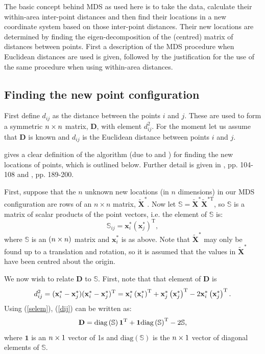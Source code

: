 The basic concept behind MDS as used here is to take the data, calculate their within-area inter-point distances and then find their locations in a new coordinate system based on those inter-point distances. Their new locations are determined by finding the eigen-decomposition of the (centred) matrix of distances between points. First a description of the MDS procedure when Euclidean distances are used is given, followed by the justification for the use of the same procedure when using within-area distances. 

\subsection{Finding the new point configuration}

First define $d_{ij}$ as the distance between the points $i$ and $j$. These are used to form a symmetric $n \times n$ matrix, $\mathbf{D}$, with \ijth element $d^2_{ij}$. For the moment let us assume that $\mathbf{D}$ is known and $d_{ij}$ is the Euclidean distance between points $i$ and $j$. 

 gives a clear definition of the algorithm (due to \cite{schoenberg35} and \cite{torgerson}) for finding the new locations of points, which is outlined below. Further detail is given in , pp. 104-108 and , pp. 189-200.

First, suppose that the $n$ unknown new locations (in $n$ dimensions) in our MDS configuration are rows of an $n \times n$ matrix, $\tilde{\mathbf{X}}^*$. Now let $\mathbb{S}=\tilde{\mathbf{X}}^{*} \tilde{\mathbf{X}}^{*\text{T}} $, so $\mathbb{S}$ is a matrix of scalar products of the point vectors, i.e. the \ijth element of $\mathbb{S}$ is:
\begin{equation}
\mathbb{S}_{ij} = \mathbf{x}_i^* \left ( \mathbf{x}_j^* \right)^\text{T},
\label{selem}
\end{equation}
where $\mathbb{S}$ is an $(n\times n)$ matrix and $\mathbf{x}_i^*$ is as above. Note that $\tilde{\mathbf{X}}^*$ may only be found up to a translation and rotation, so it is assumed that the values in $\tilde{\mathbf{X}}^*$ have been centred about the origin.

We now wish to relate $\mathbf{D}$ to $\mathbb{S}$. First, note that that \ijth element of $\mathbf{D}$ is 
\begin{equation}
d_{ij}^2 = (\mathbf{x}^*_i-\mathbf{x}^*_j)(\mathbf{x}^*_i-\mathbf{x}^*_j)^{\text{T}} = \mathbf{x}^*_i \left(\mathbf{x}^*_i\right )^\text{T} + \mathbf{x}^*_j \left ( \mathbf{x}^*_j\right )^\text{T}  -2 \mathbf{x}^*_i \left (\mathbf{x}^*_j\right )^\text{T}.
\label{dij}
\end{equation}
Using (\ref{selem}),  (\ref{dij}) can be written as:
\begin{equation}
\mathbf{D}=\text{diag}\left(\mathbb{S}\right)\bm{1}^{\text{T}} + \bm{1}\text{diag}\left(\mathbb{S}\right)^{\text{T}} -2\mathbb{S},
\label{dijmat}
\end{equation}
where $\bm{1}$ is an $n \times 1$ vector of 1s and $\text{diag}\left(\mathbb{S}\right)$ is the $n \times 1$ vector of diagonal elements of $\mathbb{S}$.

